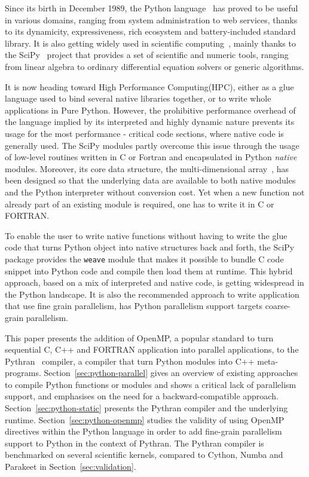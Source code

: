 \documentclass[conference]{IEEEtran}
\begin{document}
Since its birth in December 1989, the Python language~\cite{rossum97} has proved
to be useful in various domains, ranging from system administration to web
services, thanks to its dynamicity, expressiveness, rich ecosystem and
battery-included standard library. It is also getting widely used in scientific
computing~\cite{Oliphant2007}, mainly thanks to the SciPy~\cite{scipy} project
that provides a set of scientific and numeric tools, ranging from linear algebra
to ordinary differential equation solvers or generic algorithms.

It is now heading toward High Performance Computing(HPC), either as a glue
language used to bind several native libraries together, or to write whole
applications in Pure Python. However, the prohibitive performance overhead of
the language implied by its interpreted and highly dynamic nature prevents its
usage for the most performance - critical code sections, where native code is
generally used. The SciPy modules partly overcome this issue through the usage
of low-level routines written in C or Fortran and encapsulated in Python
\emph{native} modules. Moreover, its core data structure, the multi-dimensional
array~\cite{numpyarray2011}, has been designed so that the underlying data are
available to both native modules and the Python interpreter without conversion
cost. Yet when a new function not already part of an existing module is
required, one has to write it in C or FORTRAN.

To enable the user to write native functions without having to write the glue
code that turns Python object into native structures back and forth, the SciPy
package provides the \texttt{weave} module that makes it possible to bundle C
code snippet into Python code and compile then load them at runtime. This hybrid
approach, based on a mix of interpreted and native code, is getting widespread
in the Python landscape. It is also the recommended approach to write
application that use fine grain parallelism, has Python parallelism support
targets coarse-grain parallelism.

This paper presents the addition of OpenMP, a popular standard to turn
sequential C, C++ and FORTRAN application into parallel applications, to the
Pythran~\cite{pythran2013} compiler, a compiler that turn Python modules into
C++ meta-programs.  Section~\ref{sec:python-parallel} gives an overview of
existing approaches to compile Python functions or modules and shows a critical
lack of parallelism support, and emphasises on the need for a
backward-compatible approach.  Section~\ref{sec:python-static} presents the
Pythran compiler and the underlying runtime. Section~\ref{sec:python-openmp}
studies the validity of using OpenMP directives within the Python language in
order to add fine-grain parallelism support to Python in the context of Pythran.
The Pythran compiler is benchmarked on several scientific kernels, compared
to Cython, Numba and Parakeet in Section~\ref{sec:validation}.
\end{document}
